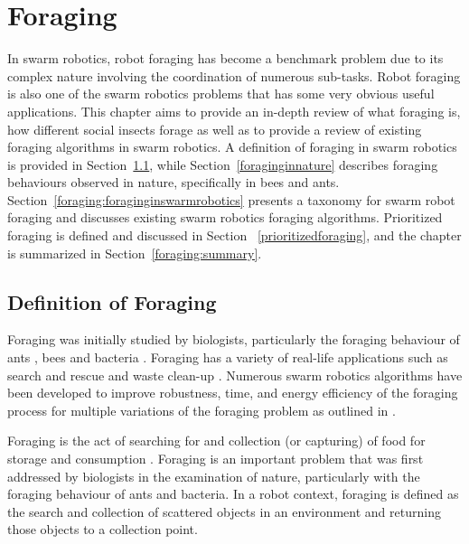 
\chapter{Foraging}
\label{chap:second}


In swarm robotics, robot foraging has become a benchmark problem due to its complex nature involving the coordination of numerous sub-tasks. Robot foraging is also one of the swarm robotics problems that has some very obvious useful applications. This chapter aims to provide an in-depth review of what foraging is, how different social insects forage as well as to provide a review of existing foraging algorithms in swarm robotics. A definition of foraging in swarm robotics is provided in Section~\ref{sec:second:definition}, while Section~\ref{foraginginnature} describes foraging behaviours observed in nature, specifically in bees and ants. Section~\ref{foraging:foraginginswarmrobotics} presents a taxonomy for swarm robot foraging and discusses existing swarm robotics foraging algorithms. Prioritized foraging is defined and discussed in Section~
\ref{prioritizedforaging}, and the chapter is summarized in Section~\ref{foraging:summary}.



\section{Definition of Foraging}
\label{sec:second:definition}

Foraging was initially studied by biologists, particularly the foraging behaviour of ants \cite{holldobler1990ants,bernstein1974seasonal}, bees \cite{seeley2009wisdom} and bacteria \cite{resnick1994turtles}. Foraging has a variety of real-life applications such as search and rescue \cite{jennings1997cooperative,murphy2000biomimetic} and waste clean-up \cite{balch1995io}. Numerous swarm robotics algorithms have been developed to improve robustness, time, and energy efficiency of the foraging process for multiple variations of the foraging problem as outlined in \cite{winfield2009foraging}. 

Foraging is the act of searching for and collection (or capturing) of food for storage and consumption \cite{winfield2009foraging}. Foraging is an important problem that was first addressed by biologists in the examination of nature, particularly with the foraging behaviour of ants and bacteria. In a robot context, foraging is defined as the search and collection of scattered objects in an environment and returning those objects to a collection point.

